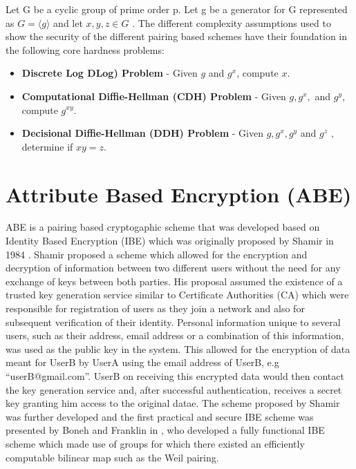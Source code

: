 Let G be a cyclic group of prime order p. Let g be a generator for G represented as $ G = \langle g \rangle $ and let $ x, y, z \in G $ . The different complexity assumptions used to show the security of the different pairing based schemes have their foundation in the following core hardness problems\cite{Lynn2007}:

\begin{itemize}
	
	\item \textbf{Discrete Log DLog) Problem} - Given $ g $ and $ g^{x} $, compute $ x $.
	
	\item \textbf{Computational Diffie-Hellman (CDH) Problem} - Given $ g, g^{x}, $ and $ g^{y} $, compute $ g^{xy} $.
	
	\item \textbf{Decisional Diffie-Hellman (DDH) Problem} - Given $ g, g^{x}, g^{y} $ and $ g^{z} $ , determine if $ xy = z $.	 
	
\end{itemize}

\section{Attribute Based Encryption (ABE)}

ABE is a pairing based cryptogaphic scheme that was developed based on Identity Based Encryption (IBE) which was originally proposed by Shamir in 1984 \cite{Shamir1985}. Shamir proposed a scheme which allowed for the encryption and decryption of information between two different users without the need for any exchange of keys between both parties. His proposal assumed the existence of a trusted key generation service similar to Certificate Authorities (CA) which were responsible for registration of users as they join a network and also for subsequent verification of their identity. Personal information unique to several users, such as their address, email address or a combination of this information, was used as the public key in the system. This allowed for the encryption of data meant for UserB by UserA using the email address of UserB, e.g “userB@gmail.com”. UserB on receiving this encrypted data would then contact the key generation service and, after successful authentication, receives a secret key granting him access to the original datae. The scheme proposed by Shamir was further developed and the first practical and secure IBE scheme was presented by Boneh and Franklin in \cite{Boneh2003}, who developed a fully functional IBE scheme which made use of groups for which there existed an efficiently computable bilinear map such as the Weil pairing.

